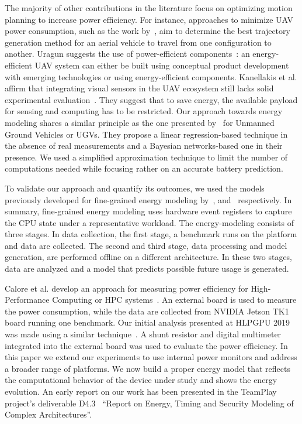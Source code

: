 The majority of other contributions in the literature focus on optimizing motion planning to increase power efficiency. For instance, approaches to minimize UAV power consumption, such as the work by~\citep{kreciglowa2017energy}, aim to determine the best trajectory generation method for an aerial vehicle to travel from one configuration to another. Uragun suggests the use of power-efficient components~\citep{uragun2011energy}: an energy-efficient UAV system can either be built using conceptual product development with emerging technologies or using energy-efficient components. Kanellakis et al. affirm that integrating visual sensors in the UAV ecosystem still lacks solid experimental evaluation~\citep{kanellakis2017survey}. They suggest that to save energy, the available payload for sensing and computing has to be restricted. Our approach towards energy modeling shares a similar principle as the one presented by~\citep{sadrpour2013mission, sadrpour2013experimental} for Unmanned Ground Vehicles or UGVs. They propose a linear regression-based technique in the absence of real measurements and a Bayesian networks-based one in their presence. We used a simplified approximation technique to limit the number of computations needed while focusing rather on an accurate battery prediction.

To validate our approach and quantify its outcomes, we used the models previously developed for fine-grained energy modeling by~\citep{nunez2013enabling}, and~\citep{nikov2015evaluation} respectively. In summary, fine-grained energy modeling uses hardware event registers to capture the CPU state under a representative workload. The energy-modeling consists of three stages. In data collection, the first stage, a benchmark runs on the platform and data are collected. The second and third stage, data processing and model generation, are performed offline on a different architecture. In these two stages, data are analyzed and a model that predicts possible future usage is generated. 

Calore et al. develop an approach for measuring power efficiency for High-Performance Computing or HPC systems~\citep{calore2015energy}. An external board is used to measure the power consumption, while the data are collected from NVIDIA Jetson TK1 board running one benchmark. Our initial analysis presented at HLPGPU 2019 was made using a similar technique~\citep{seewald2019hlpgpu}. A shunt resistor and digital multimeter integrated into the external board was used to evaluate the power efficiency. In this paper we extend our experiments to use internal power monitors and address a broader range of platforms. We now build a proper energy model that reflects the computational behavior of the device under study and shows the energy evolution. An early report on our work has been presented in the TeamPlay project's deliverable D4.3~\citep{teamplay} ``Report on Energy, Timing and Security Modeling of Complex Architectures''.


